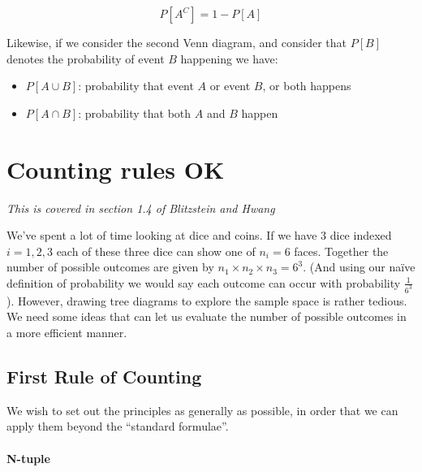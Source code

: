 \documentclass[12pt]{extbook}
\begin{document}
\begin{displaymath}
P[A^C] = 1 - P[A]
\end{displaymath}


Likewise, if we consider the second Venn diagram, and consider that $P[B]$ denotes the probability of event $B$ happening we have:

\begin{itemize}
\item $P[A \cup B]$: probability that event $A$ or event $B$, or both happens
\item $P[A \cap B]$: probability that both $A$ and $B$ happen
\end{itemize}


\begin{enumerate}

\end{enumerate}



\chapter{Counting rules OK}

\textit{This is covered in section 1.4 of Blitzstein and Hwang}

We've spent a lot of time looking at dice and coins.   If we have 3 dice indexed $i=1,2,3$ each of these three dice can show one of $n_i=6$ faces.   Together the number of possible outcomes are given by $n_1 \times n_2 \times n_3 = 6^3$.   (And using our na\"ive definition of probability we would say each outcome can occur with probability $\frac{1}{6^3}$).   However, drawing tree diagrams to explore the sample space is rather tedious.   We need some ideas that can let us evaluate the number of possible outcomes in a more efficient manner.



\section{First Rule of Counting}

We wish to set out the principles as generally as possible, in order that we can apply them beyond the ``standard formulae''.

\subsubsection{N-tuple}
\end{document}
